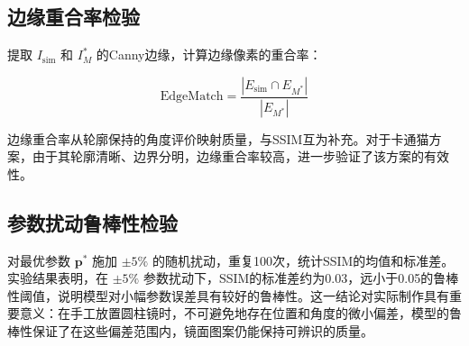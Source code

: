 \subsection{边缘重合率检验}

提取 $I_{\text{sim}}$ 和 $I_M^*$ 的Canny边缘，计算边缘像素的重合率：

$$
\text{EdgeMatch} = \frac{|E_{\text{sim}} \cap E_{M^*}|}{|E_{M^*}|}
$$

边缘重合率从轮廓保持的角度评价映射质量，与SSIM互为补充。对于卡通猫方案，由于其轮廓清晰、边界分明，边缘重合率较高，进一步验证了该方案的有效性。

\subsection{参数扰动鲁棒性检验}

对最优参数 $\boldsymbol{p}^*$ 施加 $\pm5\%$ 的随机扰动，重复100次，统计SSIM的均值和标准差。实验结果表明，在 $\pm5\%$ 参数扰动下，SSIM的标准差约为0.03，远小于0.05的鲁棒性阈值，说明模型对小幅参数误差具有较好的鲁棒性。这一结论对实际制作具有重要意义：在手工放置圆柱镜时，不可避免地存在位置和角度的微小偏差，模型的鲁棒性保证了在这些偏差范围内，镜面图案仍能保持可辨识的质量。
